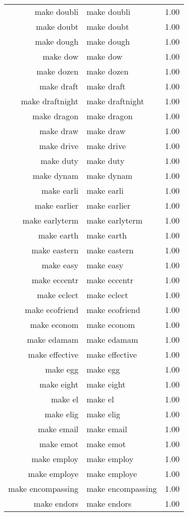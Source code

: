\begin{table}[ht]
\begin{tabular}{rlr}
  make doubli & make doubli & 1.00 \\ 
  make doubt & make doubt & 1.00 \\ 
  make dough & make dough & 1.00 \\ 
  make dow & make dow & 1.00 \\ 
  make dozen & make dozen & 1.00 \\ 
  make draft & make draft & 1.00 \\ 
  make draftnight & make draftnight & 1.00 \\ 
  make dragon & make dragon & 1.00 \\ 
  make draw & make draw & 1.00 \\ 
  make drive & make drive & 1.00 \\ 
  make duty & make duty & 1.00 \\ 
  make dynam & make dynam & 1.00 \\ 
  make earli & make earli & 1.00 \\ 
  make earlier & make earlier & 1.00 \\ 
  make earlyterm & make earlyterm & 1.00 \\ 
  make earth & make earth & 1.00 \\ 
  make eastern & make eastern & 1.00 \\ 
  make easy & make easy & 1.00 \\ 
  make eccentr & make eccentr & 1.00 \\ 
  make eclect & make eclect & 1.00 \\ 
  make ecofriend & make ecofriend & 1.00 \\ 
  make econom & make econom & 1.00 \\ 
  make edamam & make edamam & 1.00 \\ 
  make effective & make effective & 1.00 \\ 
  make egg & make egg & 1.00 \\ 
  make eight & make eight & 1.00 \\ 
  make el & make el & 1.00 \\ 
  make elig & make elig & 1.00 \\ 
  make email & make email & 1.00 \\ 
  make emot & make emot & 1.00 \\ 
  make employ & make employ & 1.00 \\ 
  make employe & make employe & 1.00 \\ 
  make encompassing & make encompassing & 1.00 \\ 
  make endors & make endors & 1.00 \\ 

\end{tabular}
\end{table}
